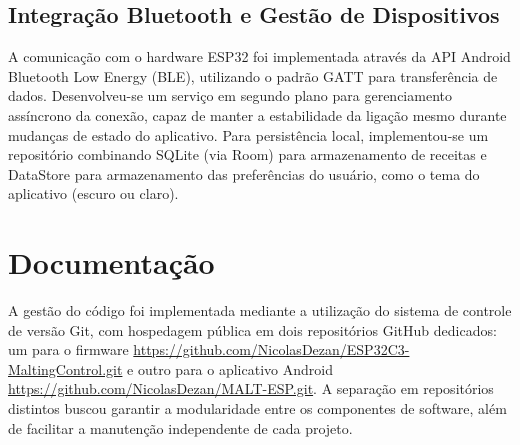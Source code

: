 \subsection{Integração Bluetooth e Gestão de Dispositivos}

A comunicação com o hardware ESP32 foi implementada através da API Android Bluetooth Low Energy (BLE), utilizando o padrão GATT para transferência de dados. Desenvolveu-se um serviço em segundo plano para gerenciamento assíncrono da conexão, capaz de manter a estabilidade da ligação mesmo durante mudanças de estado do aplicativo. Para persistência local, implementou-se um repositório combinando SQLite (via Room) para armazenamento de receitas e DataStore para armazenamento das preferências do usuário, como o tema do aplicativo (escuro ou claro).



\section{Documentação}
A gestão do código foi implementada mediante a utilização do sistema de controle de versão Git, com hospedagem pública em dois repositórios GitHub dedicados: um para o firmware \url{https://github.com/NicolasDezan/ESP32C3-MaltingControl.git} e outro para o aplicativo Android \url{https://github.com/NicolasDezan/MALT-ESP.git}. A separação em repositórios distintos buscou garantir a modularidade entre os componentes de software, além de facilitar a manutenção independente de cada projeto.

